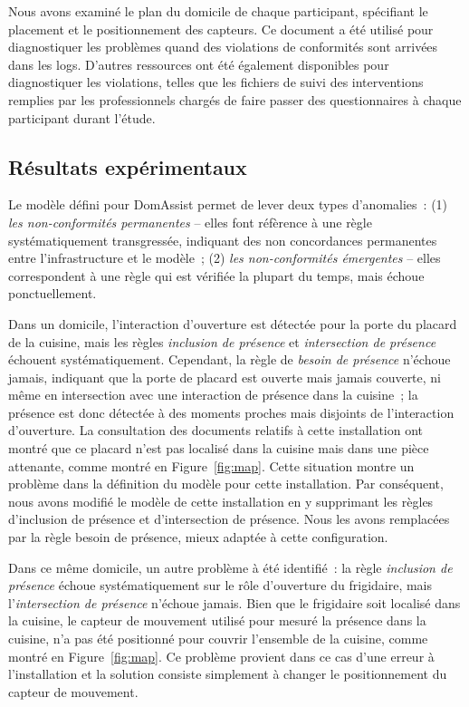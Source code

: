 Nous avons examiné le plan du domicile de chaque participant, spécifiant le placement 
et le positionnement des capteurs. Ce document a été utilisé pour 
diagnostiquer les problèmes quand des violations de conformités sont arrivées dans 
les logs. D'autres ressources ont été également disponibles pour diagnostiquer 
les violations, telles que les fichiers de suivi des interventions remplies par les 
professionnels chargés de faire passer des questionnaires à chaque participant
durant l'étude.

\subsection{Résultats expérimentaux}\label{validation:results}
Le modèle défini pour DomAssist permet de lever deux types 
d'anomalies~: (1) {\em les non-conformités permanentes} -- elles font réfèrence à une règle 
systématiquement transgressée, indiquant des non concordances permanentes entre 
l'infrastructure et le modèle~; (2) {\em les non-conformités émergentes}
-- elles correspondent à une règle qui est vérifiée la plupart du temps, mais échoue 
ponctuellement.

Dans un domicile, l'interaction d'ouverture est détectée pour la porte du 
placard de la cuisine, mais les règles {\em inclusion de présence} et 
{\em intersection de présence} échouent systématiquement. Cependant, 
la règle de {\em besoin de présence} n'échoue jamais, indiquant que la porte de 
placard est ouverte mais jamais couverte, ni même en intersection avec une interaction de présence dans la 
cuisine~; la présence est donc détectée à des moments proches mais disjoints de
l'interaction d'ouverture. La consultation des documents relatifs à cette 
installation ont montré que ce placard n'est pas localisé dans la cuisine mais 
dans une pièce attenante, comme montré en Figure~\ref{fig:map}. Cette situation 
montre un problème dans la définition du modèle pour cette
installation. Par conséquent, nous avons modifié le modèle de cette installation en y supprimant 
les règles d'inclusion de présence et d'intersection de présence. Nous
les avons remplacées par la règle besoin de présence, mieux adaptée à cette configuration.

Dans ce même domicile, un autre problème à été identifié~: la règle 
{\em inclusion de présence} échoue systématiquement sur le rôle d'ouverture du 
frigidaire, mais l'{\em intersection de présence} n'échoue jamais. Bien que le 
frigidaire soit localisé dans la cuisine, le capteur de mouvement utilisé pour 
mesuré la présence dans la cuisine, n'a pas été positionné pour couvrir 
l'ensemble de la cuisine, comme montré en Figure~\ref{fig:map}. 
Ce problème provient dans ce cas d'une erreur à l'installation et la solution
consiste simplement à changer le positionnement du capteur de mouvement. 

